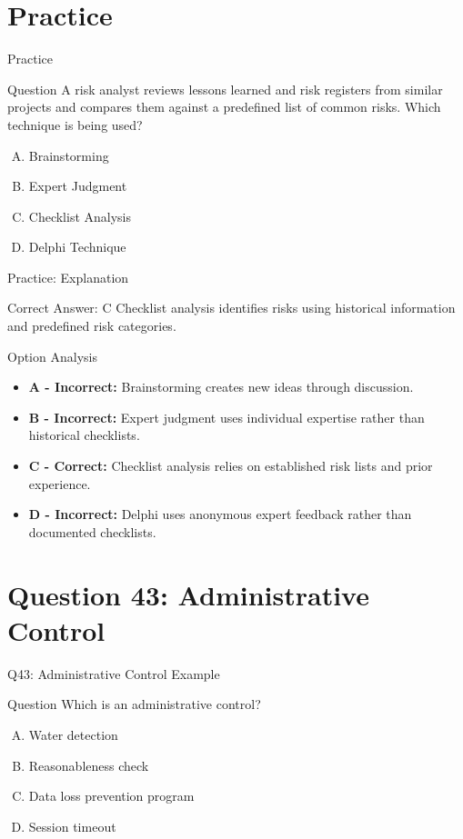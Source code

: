 \documentclass{beamer}
\begin{document}
	\section{Practice}
	
	\begin{frame}{Practice}
		\begin{block}{Question}
			A risk analyst reviews lessons learned and risk registers from similar projects and compares them against a predefined list of common risks. Which technique is being used?
		\end{block}
		\begin{enumerate}[(A)]
			\item Brainstorming
			\item Expert Judgment
			\item Checklist Analysis
			\item Delphi Technique
		\end{enumerate}
	\end{frame}
	
	\begin{frame}{Practice: Explanation}
		\begin{block}{Correct Answer: C}
			Checklist analysis identifies risks using historical information and predefined risk categories.
		\end{block}
		\begin{block}{Option Analysis}
			\begin{itemize}
				\item \textbf{A - Incorrect:} Brainstorming creates new ideas through discussion.
				\item \textbf{B - Incorrect:} Expert judgment uses individual expertise rather than historical checklists.
				\item \textbf{C - Correct:} Checklist analysis relies on established risk lists and prior experience.
				\item \textbf{D - Incorrect:} Delphi uses anonymous expert feedback rather than documented checklists.
			\end{itemize}
		\end{block}
	\end{frame}
	
	\section{Question 43: Administrative Control}
	
	\begin{frame}{Q43: Administrative Control Example}
		\begin{block}{Question}
			Which is an administrative control?
		\end{block}
		\begin{enumerate}[(A)]
			\item Water detection
			\item Reasonableness check
			\item Data loss prevention program
			\item Session timeout
		\end{enumerate}
	\end{frame}
	
\end{document}
